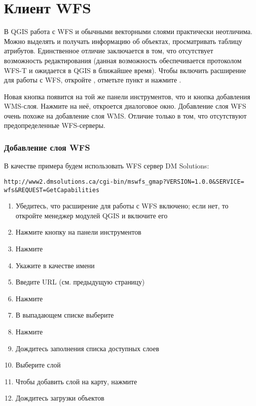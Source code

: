 %
%
\section{Клиент WFS}\label{sec:ogc-wfs}

В QGIS работа с WFS и обычными векторными слоями практически неотличима.
Можно выделять и получать информацию об объектах, просматривать таблицу
атрибутов. Единственное отличие заключается в том, что отсутствует возможность
редактирования (данная возможность обеспечивается протоколом WFS-T и ожидается
в QGIS в ближайшее время). Чтобы включить расширение для работы с WFS, откройте
 \arrow {}, отметьте пункт  и нажмите
.

Новая кнопка  появится на той
же панели инструментов, что и кнопка добавления WMS-слоя. Нажмите на неё,
откроется диалоговое окно. Добавление слоя WFS очень похоже на добавление слоя
WMS. Отличие только в том, что отсутствуют предопределенные WFS-серверы.

\subsubsection{Добавление слоя WFS}

В качестве примера будем использовать WFS сервер DM Solutions:
\begin{verbatim}
http://www2.dmsolutions.ca/cgi-bin/mswfs_gmap?VERSION=1.0.0&SERVICE=
wfs&REQUEST=GetCapabilities
\end{verbatim}

\begin{enumerate}
  \item Убедитесь, что расширение для работы с WFS включено; если нет, то
  откройте менеджер модулей QGIS и включите его
  \item Нажмите кнопку
  на панели инструментов
  \item Нажмите 
  \item Укажите  в качестве имени
  \item Введите URL (см. предыдущую страницу)
  \item Нажмите 
  \item В выпадающем списке выберите 
  \item Нажмите 
  \item Дождитесь заполнения списка доступных слоев
  \item Выберите слой 
  \item Чтобы добавить слой на карту, нажмите 
  \item Дождитесь загрузки объектов
\end{enumerate}

